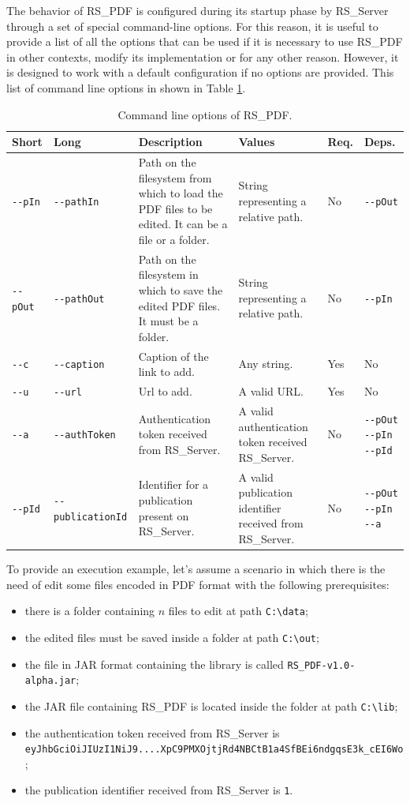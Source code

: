 \documentclass[a4paper, english]{article}
\begin{document}
The behavior of RS\_PDF is configured during its startup phase by RS\_Server through a set of special command-line options. For this reason, it is useful to provide a list of all the options that can be used if it is necessary to use RS\_PDF in other contexts, modify its implementation or for any other reason. However, it is designed to work with a default configuration if no options are provided. This list of command line options in shown in Table \ref{tab:cli}. 
\begin{table}
\centering
\begin{threeparttable}
\begin{tabular}{p{1cm}p{2.4cm}p{3cm}p{3cm}p{1cm}p{1cm}}
\toprule
\textbf{Short}  &\textbf{Long} & \textbf{Description} & \textbf{Values} & \textbf{Req.} & \textbf{Deps.}  \\
\midrule
\verb|--pIn| & \verb|--pathIn | & Path on the filesystem from which to load the PDF files to be edited. It can be a file or a folder. & String representing a relative path. & No & \verb|--pOut| \\
\verb|--pOut| & \verb|--pathOut | & Path on the filesystem in which to save the edited PDF files. It must be a folder. & String representing a relative path. & No & \verb|--pIn| \\
\verb|--c| & \verb|--caption | & Caption of the link to add. & Any string. & Yes & No \\
\verb|--u| & \verb|--url | & Url to add. & A valid URL. & Yes & No \\
\verb|--a| &  \verb|--authToken| & Authentication token received from RS\_Server. & A valid authentication token received RS\_Server. & No & \verb|--pOut| \verb|--pIn| \verb|--pId|\\
\verb|--pId| &  \verb|--publicationId| & Identifier for a publication present on RS\_Server. & A valid publication identifier received from RS\_Server. & No & \verb|--pOut| \verb|--pIn| \verb|--a|\\
\bottomrule
\end{tabular}
\caption{Command line options of RS\_PDF.}
\label{tab:cli}
 \end{threeparttable}
\end{table}
To provide an execution example, let's assume a scenario in which there is the need of edit some files encoded in PDF format with the following prerequisites:
\begin{itemize}
\item there is a folder containing $n$ files to edit at path \verb|C:\data|;
\item the edited files must be saved inside a folder at path \verb|C:\out|;
\item the file in JAR format containing the library is called \verb|RS_PDF-v1.0-alpha.jar|;
\item the JAR file containing RS\_PDF is located inside the folder at path \verb|C:\lib|;
\item the authentication token received from RS\_Server is \\ \verb|eyJhbGciOiJIUzI1NiJ9....XpC9PMXOjtjRd4NBCtB1a4SfBEi6ndgqsE3k_cEI6Wo|;
\item the publication identifier received from RS\_Server is \verb|1|.
\end{itemize}
\end{document}
